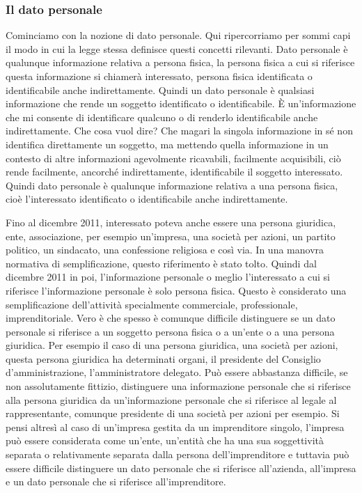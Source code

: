 \subsubsection{Il dato personale}
Cominciamo con la nozione di dato personale. Qui ripercorriamo per sommi capi il modo in cui la legge stessa definisce questi concetti rilevanti. Dato personale è qualunque informazione relativa a persona fisica, la persona fisica a cui si riferisce questa informazione si chiamerà interessato, persona fisica identificata o identificabile anche indirettamente. Quindi un dato personale è qualsiasi informazione che rende un soggetto identificato o identificabile. 
È un'informazione che mi consente di identificare qualcuno o di renderlo identificabile anche indirettamente. 
Che cosa vuol dire? Che magari la singola informazione in sé non identifica direttamente un soggetto, ma mettendo quella informazione in un contesto di altre informazioni agevolmente ricavabili, facilmente acquisibili, ciò rende facilmente, ancorché indirettamente, identificabile il soggetto interessato. Quindi dato personale è qualunque informazione relativa a una persona fisica, cioè l'interessato identificato o identificabile anche indirettamente. 

Fino al dicembre 2011, interessato poteva anche essere una persona giuridica, ente, associazione, per esempio un'impresa, una società per azioni, un partito politico, un sindacato, una confessione religiosa e così via. In una manovra normativa di semplificazione, questo riferimento è stato tolto. Quindi dal dicembre 2011 in poi, l'informazione personale o meglio l'interessato a cui si riferisce l'informazione personale è solo persona fisica. Questo è considerato una semplificazione dell'attività specialmente commerciale, professionale, imprenditoriale. Vero è che spesso è comunque difficile distinguere se un dato personale si riferisce a un soggetto persona fisica o a un'ente o a una persona giuridica. Per esempio il caso di una persona giuridica, una società per azioni, questa persona giuridica ha determinati organi, il presidente del Consiglio d'amministrazione, l'amministratore delegato. Può essere abbastanza difficile, se non assolutamente fittizio, distinguere una informazione personale che si riferisce alla persona giuridica da un'informazione personale che si riferisce al legale al rappresentante, comunque presidente di una società per azioni per esempio. Si pensi altresì al caso di un'impresa gestita da un imprenditore singolo, l'impresa può essere considerata come un'ente, un'entità che ha una sua soggettività separata o relativamente separata dalla persona dell'imprenditore e tuttavia può essere difficile distinguere un dato personale che si riferisce all'azienda, all'impresa e un dato personale che si riferisce all'imprenditore. 

